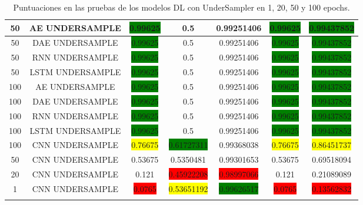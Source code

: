 \begin{longtable}{|c|c|c|c|c|c|c|}
	50 & AE UNDERSAMPLE & \colorbox{green}{0.99625} & 0.5 & 0.99251406 & \colorbox{green}{0.99625} & \colorbox{green}{0.99437852}\\ \hline
	50 & DAE UNDERSAMPLE & \colorbox{green}{0.99625} & 0.5 & 0.99251406 & \colorbox{green}{0.99625} & \colorbox{green}{0.99437852}\\ \hline
	50 & RNN UNDERSAMPLE & \colorbox{green}{0.99625} & 0.5 & 0.99251406 & \colorbox{green}{0.99625} & \colorbox{green}{0.99437852}\\ \hline
	50 & LSTM UNDERSAMPLE & \colorbox{green}{0.99625} & 0.5 & 0.99251406 & \colorbox{green}{0.99625} & \colorbox{green}{0.99437852}\\ \hline
	100 & AE UNDERSAMPLE & \colorbox{green}{0.99625} & 0.5 & 0.99251406 & \colorbox{green}{0.99625} & \colorbox{green}{0.99437852}\\ \hline
	100 & DAE UNDERSAMPLE & \colorbox{green}{0.99625} & 0.5 & 0.99251406 & \colorbox{green}{0.99625} & \colorbox{green}{0.99437852}\\ \hline
	100 & RNN UNDERSAMPLE & \colorbox{green}{0.99625} & 0.5 & 0.99251406 & \colorbox{green}{0.99625} & \colorbox{green}{0.99437852}\\ \hline
	100 & LSTM UNDERSAMPLE & \colorbox{green}{0.99625} & 0.5 & 0.99251406 & \colorbox{green}{0.99625} & \colorbox{green}{0.99437852}\\ \hline
	100 & CNN UNDERSAMPLE & \colorbox{yellow}{0.76675} & \colorbox{green}{0.61727311} & 0.99368038 & \colorbox{yellow}{0.76675} & \colorbox{yellow}{0.86451737}\\ \hline
	50 & CNN UNDERSAMPLE & 0.53675 & 0.5350481 & 0.99301653 & 0.53675 & 0.69518094\\ \hline
	20 & CNN UNDERSAMPLE & 0.121 & \colorbox{red}{0.45922208} & \colorbox{red}{0.98997066} & 0.121 & 0.21089089\\ \hline
	1 & CNN UNDERSAMPLE & \colorbox{red}{0.0765} & \colorbox{yellow}{0.53651192} & \colorbox{green}{0.99626517} & \colorbox{red}{0.0765} & \colorbox{red}{0.13562832}\\ \hline
	\caption{Puntuaciones en las pruebas de los modelos DL con UnderSampler en 1, 20, 50 y 100 epochs.}
	\label{t:5}
\end{longtable}

